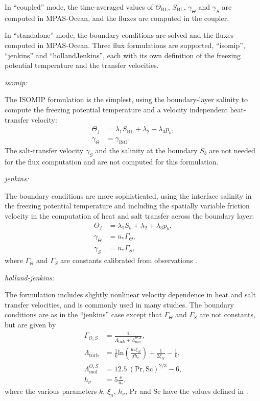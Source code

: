 In ``coupled'' mode, the time-averaged values of $\Theta_\textrm{BL}$, $S_\textrm{BL}$,
$\gamma_\Theta$ and $\gamma_S$ are computed in MPAS-Ocean, and the fluxes are computed
in the coupler.

In ``standalone'' mode, the boundary conditions are solved and the fluxes computed in 
MPAS-Ocean.  Three flux formulations are supported, ``isomip'', ``jenkins'' and 
``hollandJenkins'', each with its own definition of the freezing potential temperature
and the transfer velocities.

\hfill \break \noindent \textit{isomip:}

\noindent The ISOMIP formulation \citep{Hunter2006} is the simplest, using the 
boundary-layer salinity to compute the freezing potential temperature and a 
velocity independent heat-transfer velocity:
\begin{align}
  \Theta_f & = \lambda_1 S_\textrm{BL} + \lambda_2 + \lambda_3 p_b, \\
  \gamma_\Theta & = \gamma_\textrm{ISO}.
\end{align}
The salt-transfer velocity $\gamma_S$ and the salinity at the boundary $S_b$
are not needed for the flux computation and are not computed for this
formulation.

\hfill \break \noindent \textit{jenkins:}

\noindent The \citet{Jenkins2010} boundary conditions are more sophisticated, 
using the interface salinity in the freezing potential temperature 
and including the spatially variable friction velocity in the computation of 
heat and salt transfer across the boundary layer:
\begin{align}
  \Theta_f & = \lambda_1 S_b + \lambda_2 + \lambda_3 p_b, \\
  \gamma_\Theta & = u_* \Gamma_\Theta, \\
  \gamma_S & = u_* \Gamma_S,
\end{align}
where $\Gamma_\Theta$ and $\Gamma_S$ are constants calibrated from observations 
\citep[e.g.][]{Jenkins2010}.

\hfill \break \noindent \textit{holland-jenkins:}

\noindent The \citet{Holland1999} formulation includes slightly nonlinear velocity 
dependence in heat and salt transfer velocities, and is commonly used in many studies.  
The boundary conditions are as in the ``jenkins'' case except that $\Gamma_\Theta$ and 
$\Gamma_S$ are not constants, but are given by
\begin{align}
  \Gamma_{\Theta,S} & = \frac{1}{\Lambda_\textrm{turb} + \Lambda_\textrm{mol}^{\Theta,S}}, \\
  \Lambda_\textrm{turb} & = \frac{1}{k} \textrm{ln}\left(\frac{u_* \xi_N}{f h_\nu}\right) + \frac{1}{2 \xi_N} - \frac{1}{k}, \\
  \Lambda_\textrm{mol}^{\Theta,S} & = 12.5~(\textrm{Pr},\textrm{Sc})^{2/3} - 6, \\
  h_\nu & = 5 \frac{\nu}{u_*},
\end{align}
where the various parameters $k$, $\xi_n$, $h_\nu$, $\textrm{Pr}$ and $\textrm{Sc}$ have the values defined 
in \citet{Holland1999}.

